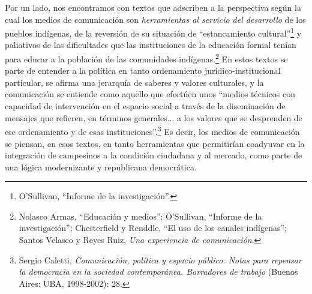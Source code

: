 \documentclass{tufte-handout}
\begin{document}
Por un lado, nos encontramos con textos que adscriben a la perspectiva
según la cual los medios de comunicación son \emph{herramientas al
servicio del desarrollo} de los pueblos indígenas, de la reversión de su
situación de ``estancamiento cultural''\footnote{O'Sullivan, ``Informe
  de la investigación''.} y paliativos de las dificultades que las
instituciones de la educación formal tenían para educar a la población
de las comunidades indígenas.\footnote{Nolasco Armas, ``Educación y
  medios''; O'Sullivan, ``Informe de la investigación''; Chesterfield y
  Renddle, ``El uso de los canales indígenas''; Santos Velasco y Reyes
  Ruiz, \emph{Una experiencia de comunicación}.} En estos textos se
parte de entender a la política en tanto ordenamiento
jurídico-institucional particular, se afirma una jerarquía de saberes y
valores culturales, y la comunicación se entiende como aquello que
efectúen unos ``medios técnicos con capacidad de intervención en el
espacio social a través de la diseminación de mensajes que refieren, en
términos generales... a los valores que se desprenden de ese
ordenamiento y de esas instituciones''.\footnote{Sergio Caletti,
  \emph{Comunicación, política y espacio público. Notas para repensar la
  democracia en la sociedad contemporánea. Borradores de trabajo}
  (Buenos Aires: UBA, 1998-2002): 28.} Es decir, los medios de
comunicación se piensan, en esos textos, en tanto herramientas que
permitirían coadyuvar en la integración de campesinos a la condición
ciudadana y al mercado, como parte de una lógica modernizante y
republicana democrática.
\end{document}
